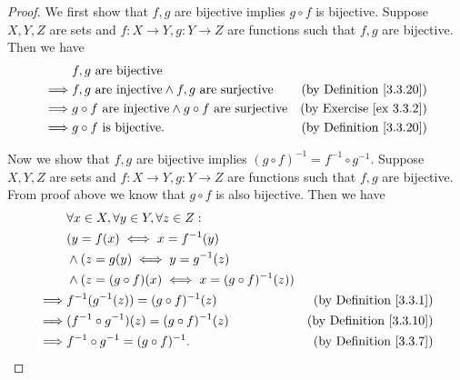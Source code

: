 \begin{proof}
    We first show that \(f, g\) are bijective implies \(g \circ f\) is bijective.
    Suppose \(X, Y, Z\) are sets and \(f : X \to Y, g : Y \to Z\) are functions such that \(f, g\) are bijective.
    Then we have
    \begin{align*}
                 & f, g \text{ are bijective}                                                                                   \\
        \implies & f, g \text{ are injective} \land f, g \text{ are surjective}           & \text{(by Definition \ref{3.3.20})} \\
        \implies & g \circ f \text{ are injective} \land g \circ f \text{ are surjective} & \text{(by Exercise \ref{ex 3.3.2})} \\
        \implies & g \circ f \text{ is bijective}.                                        & \text{(by Definition \ref{3.3.20})}
    \end{align*}

    Now we show that \(f, g\) are bijective implies \((g \circ f)^{-1} = f^{-1} \circ g^{-1}\).
    Suppose \(X, Y, Z\) are sets and \(f : X \to Y, g : Y \to Z\) are functions such that \(f, g\) are bijective.
    From proof above we know that \(g \circ f\) is also bijective.
    Then we have
    \begin{align*}
                 & \forall x \in X, \forall y \in Y, \forall z \in Z :                                           \\
                 & (y = f(x) \iff x = f^{-1}(y)                                                                  \\
                 & \land (z = g(y) \iff y = g^{-1}(z)                                                            \\
                 & \land (z = (g \circ f)(x) \iff x = (g \circ f)^{-1}(z))                                       \\
        \implies & f^{-1}(g^{-1}(z)) = (g \circ f)^{-1}(z)                 & \text{(by Definition \ref{3.3.1})}  \\
        \implies & (f^{-1} \circ g^{-1})(z) = (g \circ f)^{-1}(z)          & \text{(by Definition \ref{3.3.10})} \\
        \implies & f^{-1} \circ g^{-1} = (g \circ f)^{-1}.                 & \text{(by Definition \ref{3.3.7})}
    \end{align*}
\end{proof}

